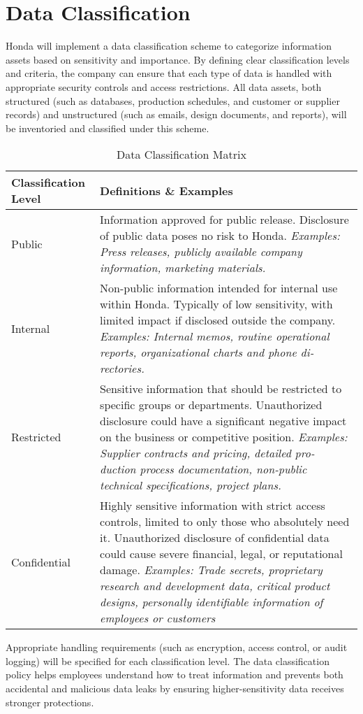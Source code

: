 \section{Data Classification}
Honda will implement a data classification scheme to categorize information assets based on sensitivity and importance. By defining clear classification levels and criteria, the company can ensure that each type of data is handled with appropriate security controls and access restrictions. All data assets, both structured (such as databases, production schedules, and customer or supplier records) and unstructured (such as emails, design documents, and reports), will be inventoried and classified under this scheme.

\begin{table}[h!]
\centering
\begin{tabular}{|l|p{10cm}|}
\hline
\textbf{Classification Level}& \textbf{Definitions \& Examples}\\
\hline
Public& Information approved for public release. Disclosure of public data poses no risk
to Honda. \textit{Examples: Press releases, publicly available company information,
marketing materials.}\\
\hline
Internal& Non-public information intended for internal use within Honda. Typically of
low sensitivity, with limited impact if disclosed outside the company. \textit{Examples:
Internal memos, routine operational reports, organizational charts and phone di-
rectories.}\\
\hline
Restricted& Sensitive information that should be restricted to specific groups or departments.
Unauthorized disclosure could have a significant negative impact on the business
or competitive position. \textit{Examples: Supplier contracts and pricing, detailed pro-
duction process documentation, non-public technical specifications, project plans.}\\
\hline
Confidential& Highly sensitive information with strict access controls, limited to only those who
absolutely need it. Unauthorized disclosure of confidential data could cause severe
financial, legal, or reputational damage. \textit{Examples: Trade secrets, proprietary
research and development data, critical product designs, personally identifiable
information of employees or customers}\\
\hline
\end{tabular}
\caption{Data Classification Matrix}
\end{table}

Appropriate handling requirements (such as encryption, access control, or audit logging) will be specified for each classification level. The data classification policy helps employees understand how to treat information and prevents both accidental and malicious data leaks by ensuring higher-sensitivity data receives stronger protections.

